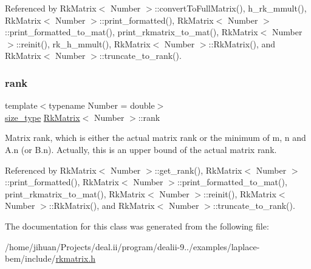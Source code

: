 Referenced by Rk\+Matrix$<$ Number $>$\+::convert\+To\+Full\+Matrix(), h\+\_\+rk\+\_\+mmult(), Rk\+Matrix$<$ Number $>$\+::print\+\_\+formatted(), Rk\+Matrix$<$ Number $>$\+::print\+\_\+formatted\+\_\+to\+\_\+mat(), print\+\_\+rkmatrix\+\_\+to\+\_\+mat(), Rk\+Matrix$<$ Number $>$\+::reinit(), rk\+\_\+h\+\_\+mmult(), Rk\+Matrix$<$ Number $>$\+::\+Rk\+Matrix(), and Rk\+Matrix$<$ Number $>$\+::truncate\+\_\+to\+\_\+rank().

\mbox{\label{classRkMatrix_aa9e60bb24bbe3ab1750f970f296d8256}} 
\subsubsection{\texorpdfstring{rank}{rank}}
{\footnotesize\ttfamily template$<$typename Number = double$>$ \\
\hyperlink{classRkMatrix_add060bfc3a4cc77f858c3d6dd58cadd5}{size\+\_\+type} \hyperlink{classRkMatrix}{Rk\+Matrix}$<$ Number $>$\+::rank\hspace{0.3cm}{\ttfamily [private]}}

Matrix rank, which is either the actual matrix rank or the minimum of {\ttfamily m}, {\ttfamily n} and {\ttfamily A.\+n} (or {\ttfamily B.\+n}). Actually, this is an upper bound of the actual matrix rank. 

Referenced by Rk\+Matrix$<$ Number $>$\+::get\+\_\+rank(), Rk\+Matrix$<$ Number $>$\+::print\+\_\+formatted(), Rk\+Matrix$<$ Number $>$\+::print\+\_\+formatted\+\_\+to\+\_\+mat(), print\+\_\+rkmatrix\+\_\+to\+\_\+mat(), Rk\+Matrix$<$ Number $>$\+::reinit(), Rk\+Matrix$<$ Number $>$\+::\+Rk\+Matrix(), and Rk\+Matrix$<$ Number $>$\+::truncate\+\_\+to\+\_\+rank().



The documentation for this class was generated from the following file\+:\begin{DoxyCompactItemize}
\item 
/home/jihuan/\+Projects/deal.\+ii/program/dealii-\/9../examples/laplace-\/bem/include/\hyperlink{rkmatrix_8h}{rkmatrix.\+h}\end{DoxyCompactItemize}
